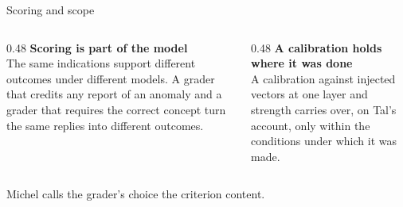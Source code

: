 \documentclass[aspectratio=169,11pt]{beamer}
\begin{document}
\begin{frame}[label=consequences]{Scoring and scope}
\begin{columns}[T]
\begin{column}{0.48\textwidth}
{\small\textbf{Scoring is part of the model}}\\[0.3em]
{\footnotesize The same indications support different outcomes under different models. A grader that credits any report of an anomaly and a grader that requires the correct concept turn the same replies into different outcomes.}
\end{column}
\begin{column}{0.48\textwidth}
{\small\textbf{A calibration holds where it was done}}\\[0.3em]
{\footnotesize A calibration against injected vectors at one layer and strength carries over, on Tal's account, only within the conditions under which it was made.}
\end{column}
\end{columns}

\vspace{0.2em}
\begin{center}
\end{center}

{\footnotesize Michel calls the grader's choice the criterion content.}
\end{frame}
\end{document}
